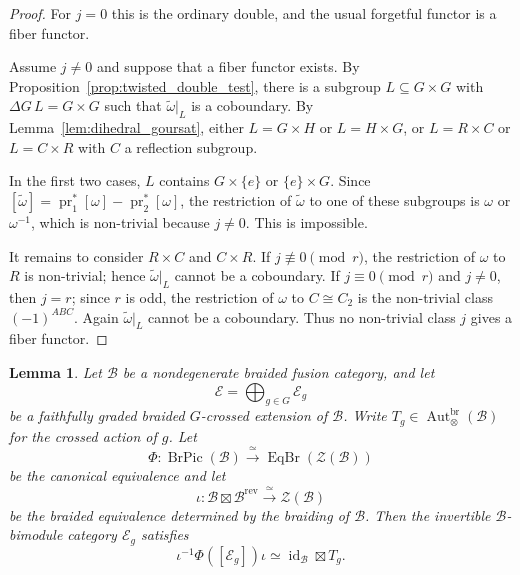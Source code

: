 \documentclass[12pt]{amsart}
\theoremstyle{plain}
\newtheorem{lemma}[theorem]{Lemma}
\theoremstyle{definition} %
\theoremstyle{remark} %
\newcommand{\cB}{\mathcal{B}}
\newcommand{\cE}{\mathcal{E}}
\newcommand{\Aut}{\operatorname{Aut}}
\newcommand{\id}{\operatorname{id}}
\newcommand{\pr}{\operatorname{pr}}
\begin{document}
\begin{proof}
For $j=0$ this is the ordinary double, and the usual forgetful functor is a fiber functor.

Assume $j\ne0$ and suppose that a fiber functor exists. By Proposition~\ref{prop:twisted_double_test}, there is a subgroup $L\subseteq G\times G$ with $\Delta G\,L=G\times G$ such that $\widetilde{\omega}|_L$ is a coboundary. By Lemma~\ref{lem:dihedral_goursat}, either $L=G\times H$ or $L=H\times G$, or $L=R\times C$ or $L=C\times R$ with $C$ a reflection subgroup.

In the first two cases, $L$ contains $G\times\{e\}$ or $\{e\}\times G$. Since $[\widetilde{\omega}]=\pr_1^*[\omega]-\pr_2^*[\omega]$, the restriction of $\widetilde{\omega}$ to one of these subgroups is $\omega$ or $\omega^{-1}$, which is non-trivial because $j\ne0$. This is impossible.

It remains to consider $R\times C$ and $C\times R$. If $j\not\equiv0\pmod r$, the restriction of $\omega$ to $R$ is non-trivial; hence $\widetilde{\omega}|_L$ cannot be a coboundary. If $j\equiv0\pmod r$ and $j\ne0$, then $j=r$; since $r$ is odd, the restriction of $\omega$ to $C\cong C_2$ is the non-trivial class $(-1)^{ABC}$. Again $\widetilde{\omega}|_L$ cannot be a coboundary. Thus no non-trivial class $j$ gives a fiber functor.
\end{proof}


\begin{lemma}\label{lem:crossed_component_brpic}
Let $\cB$ be a nondegenerate braided fusion category, and let
\[
\cE=\bigoplus_{g\in G}\cE_g
\]
be a faithfully graded braided $G$-crossed extension of $\cB$.  Write
$T_g\in\Aut^{\mathrm{br}}_\otimes(\cB)$ for the crossed action of $g$.  Let
\[
\Phi:\operatorname{BrPic}(\cB)
   \xrightarrow{\ \simeq\ }
   \operatorname{EqBr}(\mathcal Z(\cB))
\]
be the canonical equivalence and let
\[
\iota:\cB\boxtimes\cB^{\mathrm{rev}}
   \xrightarrow{\ \simeq\ }
   \mathcal Z(\cB)
\]
be the braided equivalence determined by the braiding of $\cB$.
Then the invertible $\cB$-bimodule category $\cE_g$ satisfies
\begin{equation}\label{eq:crossed_component_brpic_formula}
\iota^{-1}\Phi([\cE_g])\iota
\simeq
\id_{\cB}\boxtimes T_g.
\end{equation}
\end{lemma}
\end{document}
